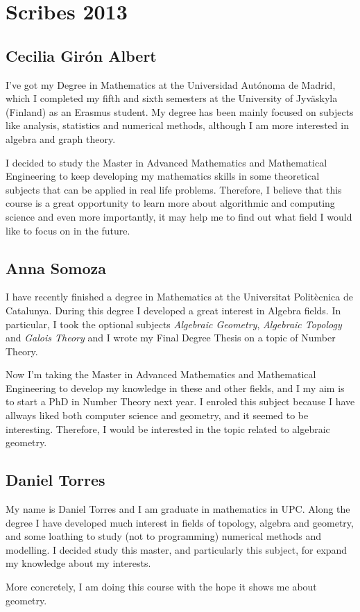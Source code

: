 \chapter*{Scribes 2013}


\section{Cecilia Girón Albert}

I've got my Degree in Mathematics at the Universidad Autónoma de Madrid, which I completed my fifth and sixth semesters 
at the University of Jyväskyla (Finland) as an Erasmus student. My degree has been mainly focused on subjects like 
analysis, statistics and numerical methods, although I am more interested in algebra and graph theory. 

I decided to study the Master in Advanced Mathematics and Mathematical Engineering to keep developing my mathematics skills 
in some theoretical subjects that can be applied in real life problems. Therefore, I believe that this course is a great 
opportunity to learn more about algorithmic and computing science and even more importantly, it may help me to find out 
what field I would like to focus on in the future.

\section{Anna Somoza}

I have recently finished a degree in Mathematics at the Universitat Politècnica de Catalunya. During this degree I developed a great interest in Algebra fields. In particular, I took the optional subjects \emph{Algebraic Geometry}, \emph{Algebraic Topology} and \emph{Galois Theory} and I wrote my Final Degree Thesis on a topic of Number Theory.

Now I'm taking the Master in Advanced Mathematics and Mathematical Engineering to develop my knowledge in these and other fields, and I my aim is to start a PhD in Number Theory next year. I enroled this subject because I have allways liked both computer science and geometry, and it seemed to be interesting. Therefore, I would be interested in the topic related to algebraic geometry.

\section{Daniel Torres}

My name is Daniel Torres and I am graduate in mathematics in UPC. Along the degree I have developed much interest in fields of topology, algebra and geometry, and some loathing to study (not to programming) numerical methods and modelling. I decided study this master, and particularly this subject, for expand my knowledge about my interests.

More concretely, I am doing this course with the hope it shows me about geometry.




